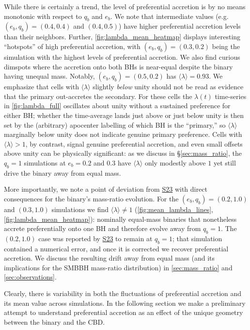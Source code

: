 \documentclass[fleqn,usenatbib]{mnras}
\newcommand{\Stwentythree}{\href{https://doi.org/10.1093/mnras/stac3263}{S23}\xspace}
\begin{document}
While there is certainly a trend, the level of preferential accretion is by no means monotonic with respect to $q_b$ and $e_b$. We note that intermediate values (e.g.\ $(e_b, q_b) = (0.4, 0.4)$ and $(0.4, 0.5)$) have higher preferential accretion levels than their neighbors. Further, \autoref{fig:lambda_mean_heatmap} displays interesting ``hotspots'' of high preferential accretion, with $(e_b, q_b) = (0.3, 0.2)$ being the simulation with the highest levels of preferential accretion. We also find curious dimspots where the accretion onto both BHs is near-equal despite the binary having unequal mass. Notably, $(e_b, q_b) = (0.5, 0.2)$ has $\langle \lambda \rangle = 0.93$. We emphasize that cells with $\langle\lambda\rangle$ slightly \emph{below} unity should not be read as evidence that the primary out-accretes the secondary. For these cells the $\lambda(t)$ time-series in \autoref{fig:lambda_full} oscillates about unity without a sustained preference for either BH; whether the time-average lands just above or just below unity is then set by the (arbitrary) apocenter labelling of which BH is the ``primary,'' so $\langle\lambda\rangle$ marginally below unity does not indicate genuine primary preference. Cells with $\langle\lambda\rangle > 1$, by contrast, signal genuine preferential accretion, and even small offsets above unity can be physically significant: as we discuss in \S\ref{sec:mass_ratio}, the $q_b = 1$ simulations at $e_b = 0.2$ and $0.3$ have $\langle\lambda\rangle$ only modestly above $1$ yet still drive the binary away from equal mass.

More importantly, we note a point of deviation from \Stwentythree with direct consequences for the binary's mass-ratio evolution. For the $(e_b, q_b) = (0.2, 1.0)$ and $(0.3, 1.0)$ simulations we find $\langle \lambda \rangle \neq 1$ (\autoref{fig:mean_lambda_lines}, \autoref{fig:lambda_mean_heatmap}): nominally equal-mass binaries that nonetheless accrete preferentially onto one BH and therefore evolve away from $q_b = 1$. The $(0.2, 1.0)$ case was reported by \Stwentythree to remain at $q_b = 1$; that simulation contained a numerical error, and once it is corrected we recover preferential accretion. We discuss the resulting drift away from equal mass (and its implications for the SMBBH mass-ratio distribution) in \autoref{sec:mass_ratio} and \autoref{sec:observations}.

Clearly, there is variability in both the fluctuations of preferential accretion and its mean value across simulations. In the following section we make a preliminary attempt to understand preferential accretion as an effect of the unique geometry between the binary and the CBD.
\end{document}
